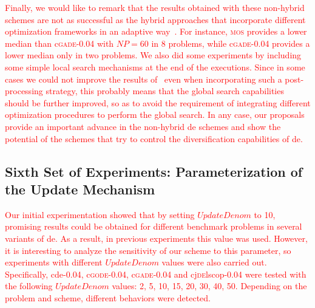 \documentclass[review,3p]{elsarticle}
\newcommand{\CDE}{c{\sc de}}
\newcommand{\DE}{{\sc de}}
\begin{document}


\textcolor{red}{
Finally, we would like to remark that the results obtained with these non-hybrid schemes are not as successful as
the hybrid approaches that incorporate different optimization frameworks in an adaptive way~\cite{LaTorre:11}.
%
For instance, \textsc{mos} provides a lower median than c\textsc{gade-0.04} with $NP = 60$ 
in 8 problems, while c\textsc{gade-0.04} provides a lower median only in two problems.
%
We also did some experiments by including some simple local search mechanisms at the end of the executions.
%
Since in some cases we could not improve the results of~\cite{LaTorre:11} even when incorporating such a post-processing strategy, this probably means that
the global search capabilities should be further improved, so as to avoid the requirement of integrating different optimization procedures
to perform the global search.
%
In any case, our proposals provide an important advance in the non-hybrid \DE{} schemes and show the potential of the schemes that try to control the
diversification capabilities of \DE{}.
}

\subsection{Sixth Set of Experiments: Parameterization of the Update Mechanism}

\textcolor{red}{
Our initial experimentation showed that by setting $UpdateDenom$ to 10, promising results could be obtained for different benchmark problems
in several variants of \DE{}.
%
As a result, in previous experiments this value was used.
%
However, it is interesting to analyze the sensitivity of our scheme to this parameter, so experiments with different $UpdateDenom$ values 
were also carried out.
%
Specifically, \CDE{}-0.04, c\textsc{gode-0.04}, c\textsc{gade-0.04} and cj\textsc{de}lscop-0.04 were tested with the following $UpdateDenom$ values: 2, 5, 10, 15, 20, 30, 40, 50.
%
Depending on the problem and scheme, different behaviors were detected.
}
\end{document}
